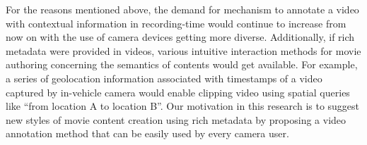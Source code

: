 For the reasons mentioned above, the demand for mechanism to annotate a video with contextual information in recording-time would continue to increase from now on with the use of camera devices getting more diverse.
Additionally, if rich metadata were provided in videos, various intuitive interaction methods for movie authoring concerning the semantics of contents would get available. 
For example, a series of geolocation information associated with timestamps of a video captured by in-vehicle camera would enable clipping video using spatial queries like ``from location A to location B''.
Our motivation in this research is to suggest new styles of movie content creation using rich metadata by proposing a video annotation method that can be easily used by every camera user.
